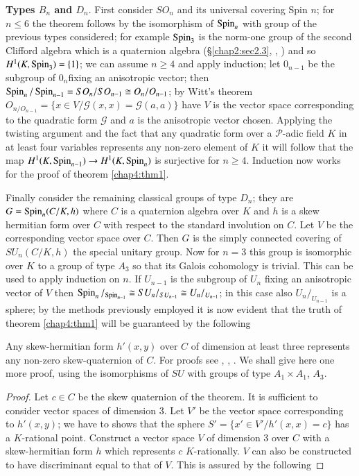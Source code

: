  \noindent
 {\bf Types $B_n$ and $D_n$}. First consider $SO_n$ and its
 universal covering Spin $n$; for $n \le 6$ the theorem follows by the
 isomorphism of $\operatorname{Spin}_n$ with group of the previous types considered;
 for example $\operatorname{Spin}_3$ is the norm-one group of the second Clifford
 algebra which is a quaternion algebra (\S \ref{chap2:sec2.3}, \cite{keyDi},
 \cite{keyE3}) and so 
 $H^1(K,\operatorname{Spin}_3)=\{1\}$; we can assume $n \ge 4$ and apply induction;
 let $0_{n-1}$ be the subgroup of $0_n$\pageoriginale fixing an
 anisotropic vector; 
 then $\operatorname{Spin}_n / \operatorname{Spin}_{n-1}=SO_n/SO_{n-1} \cong O_n /O_{n-1}$; by
 Witt's theorem $O_{n/O_{n-1}}=\bigg \{ x \in V/
 \mathscr{G}(x,x)=\mathscr{G}(a,a)\bigg\}$ have $V$ is the vector
 space corresponding to the quadratic form $\mathscr{G}$ and $a$ is the
 anisotropic vector chosen. Applying the twisting argument and the
 fact that any quadratic form over a $\mathscr{P}$-adic field $K$ in
 at least four variables represents any non-zero element of $K$ it will
 follow that the map $H^1(K, \operatorname{Spin}_{n-1}) \to H^1(K, \operatorname{Spin}_n)$ is
 surjective for $n \ge 4$. Induction now works for the proof of
 theorem \ref{chap4:thm1}. 
 
 Finally consider the remaining classical groups of type $D_n$; they
 are $G= \operatorname{Spin}_n(C/K,h)$ where $C$ is a quaternion algebra over $K$
 and $h$ is a skew hermitian form over $C$  with respect to the
 standard involution on $C$. Let $V$ be the corresponding vector space
 over $C$. Then $G$ is the simply connected covering of $SU_n(C/K,h)$
 the special unitary group. Now for $n=3$ this group is isomorphic
 over $K$ to a group of type $A_3$ so that its Galois cohomology is
 trivial. This can be used to apply induction on $n$. If $U_{n-1}$ is
 the subgroup of $U_n$ fixing an anisotropic vector of $V$ then
 $\operatorname{Spin}_{n} /_{\operatorname{Spin}_{n-1}} \cong SU_n/_{SU_{n-1}}\cong
 U_n/_{U_{n-1}}$; in this case also $U_n/_{U_{n-1}}$ is a sphere; by
 the methods previously employed it is now evident that the truth of
 theorem \ref{chap4:thm1} will be guaranteed by the following 
 
 \begin{lem} %
Any skew-hermitian form $h'(x,y)$ over $C$ of dimension at least three
represents any non-zero skew-quaternion of $C$. For proofs see \cite{keyJ},
\cite{keyK2}, \cite{keyTs}. We shall give here one more proof,
using\pageoriginale 
the isomorphisms of $SU$ with groups of type $A_1 \times A_1$, $A_3$.   
 \end{lem} 

\begin{proof}
Let $c \in C$ be the skew quaternion of the theorem. It is sufficient
to consider vector spaces of dimension 3. Let $V'$ be the vector
space corresponding to $h'(x,y)$; we have to shows that the sphere $
S'=\bigg\{ x '\in V'/h'(x,x)=c \bigg\}$ has a $K$-rational
point. Construct a vector space $V$ of dimension 3 over $C$ with a
skew-hermitian form $h$ which represents $c$ $K$-rationally. $V$ can
also be constructed to have discriminant equal to that of $V$. This is
assured by the following 
 \end{proof} 
 
